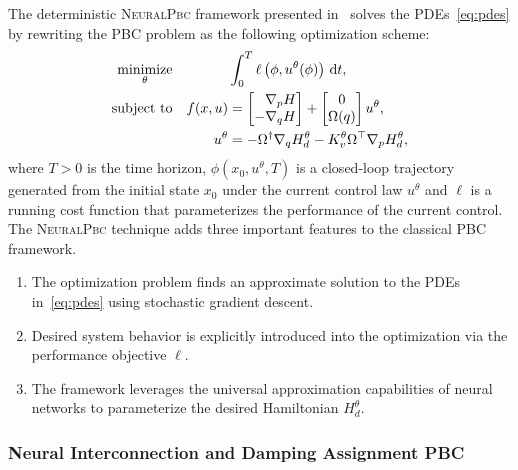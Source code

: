 The deterministic \textsc{NeuralPbc} framework presented in~\cite{ashenafi2022robust}
solves the PDEs~\eqref{eq:pdes} by rewriting the PBC problem as the following 
optimization scheme:
\begin{equation}
  \begin{aligned}
      \underset{\theta}{\textrm{minimize}} 
      & & &\int_{0}^{T} \ell \left(\phi,u^{\theta}(\phi) \right) \, \dd t , \\%
      \textrm{subject to}
      & & f(x, u) &= \bmat{\phantom{-}\nabla_p H \\ -\nabla_q H} + \bmat{0 \\ \Omega(q)}u^{\theta}, \\%
      & & u^{\theta} &= -\Omega^{\dagger} \nabla_q H_d^{\theta} - K_v^{\theta} \Omega^\top \nabla_p H_d^{\theta},%
  \end{aligned}
  \label{eq:neural_pbc_finite_optim}
\end{equation}
where $T>0$ is the time horizon, $\phi( x_0, u^\theta, T)$ is a closed-loop
trajectory generated from the initial state $x_0$ under the current control law
$u^\theta$ and $\ell$ is a running cost function that parameterizes the
performance of the current control.
%
The \textsc{NeuralPbc} technique adds three important features to the classical 
PBC framework.
\begin{enumerate}
  \item The optimization problem finds an approximate solution to the PDEs
  in~\eqref{eq:pdes} using stochastic gradient descent.
  \item Desired system behavior is explicitly introduced into the optimization
      via the performance objective $\ell$.~
  \item The framework leverages the universal approximation capabilities of
  neural networks to parameterize the desired Hamiltonian $H^\theta_d$.
\end{enumerate}

\subsubsection{Neural Interconnection and Damping Assignment PBC}

